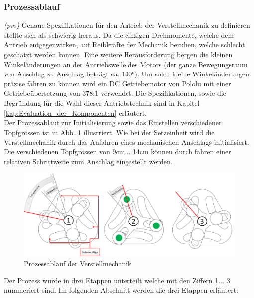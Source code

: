 \subsubsection{Prozessablauf}
\textit{(pro)} Genaue Spezifikationen für den Antrieb der Verstellmechanik zu definieren stellte sich als schwierig heraus. Da die einzigen Drehmomente, welche dem Antrieb entgegenwirken, auf Reibkräfte der Mechanik beruhen, welche schlecht geschätzt werden können. Eine weitere Herausforderung bergen die kleinen Winkeländerungen an der Antriebswelle des Motors (der ganze Bewegungsraum von Anschlag zu Anschlag beträgt ca. 100°). Um solch kleine Winkeländerungen präzise fahren zu können wird ein DC Getriebemotor von Pololu mit einer Getriebeübersetzung von 378:1 verwendet.  Die Spezifikationen, sowie die Begründung für die Wahl dieser Antriebstechnik sind in Kapitel \ref{kap:Evaluation_der_Komponenten} erläutert.\\
Der Prozessablauf zur Initialisierung sowie das Einstellen verschiedener Topfgrössen ist in Abb. \ref{fig:Prozessablauf_Verstellmechanik} illustriert. Wie bei der Setzeinheit wird die Verstellmechanik durch das Anfahren eines mechanischen Anschlags initialisiert. Die verschiedenen Topfgrössen von 9cm... 14cm können durch fahren einer relativen Schrittweite zum Anschlag eingestellt werden.

\begin{figure}[H]
	\includegraphics[width=1\textwidth]{Illustrationen/6-Umsetzung/Prozessablauf_Verstellmechanik.png}
	\caption{Prozessablauf der Verstellmechanik}
	\label{fig:Prozessablauf_Verstellmechanik}
\end{figure}

Der Prozess wurde in drei Etappen unterteilt welche mit den Ziffern 1... 3 nummeriert sind. Im folgenden Abschnitt werden die drei Etappen erläutert:

